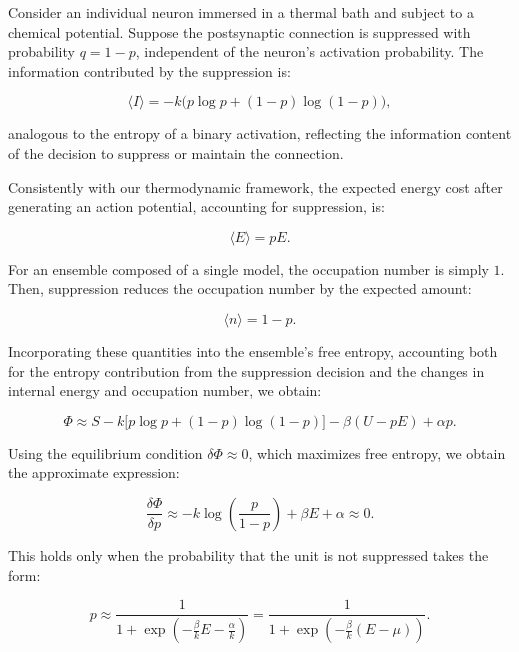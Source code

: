 \documentclass[12pt]{article}
\begin{document}
Consider an individual neuron immersed in a thermal bath and subject to a chemical potential. Suppose the postsynaptic connection is suppressed with probability $q = 1-p$, independent of the neuron’s activation probability. The information contributed by the suppression is:

\begin{equation}
\langle I \rangle = -k \big( p \log p + (1-p) \log(1-p) \big),
\end{equation}

analogous to the entropy of a binary activation, reflecting the information content of the decision to suppress or maintain the connection.

Consistently with our thermodynamic framework, the expected energy cost after generating an action potential, accounting for suppression, is:

\begin{equation}
\langle E \rangle = p E.
\end{equation}

For an ensemble composed of a single model, the occupation number is simply $1$. Then, suppression reduces the occupation number by the expected amount:

\begin{equation}
\langle n \rangle = 1-p.
\end{equation}

Incorporating these quantities into the ensemble’s free entropy, accounting both for the entropy contribution from the suppression decision and the changes in internal energy and occupation number, we obtain:

\begin{equation}
\Phi \approx S - k \big[ p \log p + (1-p) \log(1-p) \big] - \beta (U-p E) + \alpha p.
\end{equation}

Using the equilibrium condition $\delta \Phi \approx 0$, which maximizes free entropy, we obtain the approximate expression:

\begin{equation}
\frac{\delta \Phi}{\delta p} \approx -k \log \left(\frac{p}{1-p}\right) + \beta E + \alpha \approx 0.
\end{equation}

This holds only when the probability that the unit is not suppressed takes the form:

\begin{equation}
p \approx \frac{1}{1+\exp(-\frac{\beta}{k}E-\frac{\alpha}{k})} = \frac{1}{1+ \exp(-\frac{\beta}{k}(E - \mu))}.
\end{equation}
\end{document}
